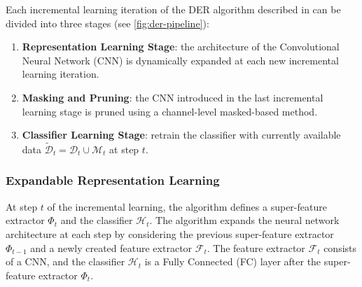 Each incremental learning iteration of the DER algorithm described in \cite{yan2021dynamically} can be divided into three stages (see \autoref{fig:der-pipeline}):
\begin{enumerate}
    \item \textbf{Representation Learning Stage}: the architecture of the Convolutional Neural Network (CNN) is dynamically expanded at each new incremental learning iteration.
    \item \textbf{Masking and Pruning}: the CNN introduced in the last incremental learning stage is pruned using a channel-level masked-based method.
    \item \textbf{Classifier Learning Stage}: retrain the classifier with currently available data $\tilde{\mathcal{D}}_t = \mathcal{D}_t \cup \mathcal{M}_t$ at step $t$.
\end{enumerate}

\subsubsection{Expandable Representation Learning}
At step $t$ of the incremental learning, the algorithm defines a super-feature extractor $\Phi_t$ and the classifier $\mathcal{H}_t$. The algorithm expands the neural network architecture at each step by considering the previous super-feature extractor $\Phi_{t-1}$ and a newly created feature extractor $\mathcal{F}_t$. The feature extractor $\mathcal{F}_t$ consists of a CNN, and the classifier $\mathcal{H}_t$ is a Fully Connected (FC) layer after the super-feature extractor $\Phi_t$.


